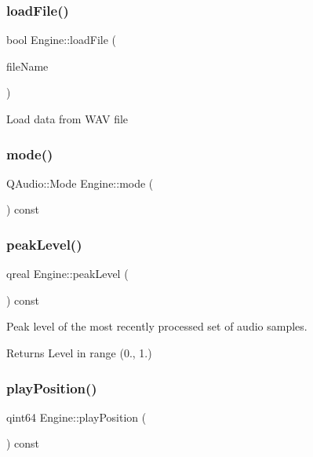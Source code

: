 \subsubsection{\texorpdfstring{load\+File()}{loadFile()}}
{\footnotesize\ttfamily bool Engine\+::load\+File (\begin{DoxyParamCaption}\item[{const Q\+String \&}]{file\+Name }\end{DoxyParamCaption})}

Load data from W\+AV file \hypertarget{class_engine_a63bb47972a1e0692432dd704a60e49bc}{}\label{class_engine_a63bb47972a1e0692432dd704a60e49bc} 
\subsubsection{\texorpdfstring{mode()}{mode()}}
{\footnotesize\ttfamily Q\+Audio\+::\+Mode Engine\+::mode (\begin{DoxyParamCaption}{ }\end{DoxyParamCaption}) const\hspace{0.3cm}{\ttfamily [inline]}}

\hypertarget{class_engine_aab1cbc9a117974fe64cb0875a02792ab}{}\label{class_engine_aab1cbc9a117974fe64cb0875a02792ab} 
\subsubsection{\texorpdfstring{peak\+Level()}{peakLevel()}}
{\footnotesize\ttfamily qreal Engine\+::peak\+Level (\begin{DoxyParamCaption}{ }\end{DoxyParamCaption}) const\hspace{0.3cm}{\ttfamily [inline]}}

Peak level of the most recently processed set of audio samples. \begin{DoxyReturn}{Returns}
Level in range (0., 1.) 
\end{DoxyReturn}
\hypertarget{class_engine_a2b295fe42d3e6e4f04f56c3f63ebe945}{}\label{class_engine_a2b295fe42d3e6e4f04f56c3f63ebe945} 
\subsubsection{\texorpdfstring{play\+Position()}{playPosition()}}
{\footnotesize\ttfamily qint64 Engine\+::play\+Position (\begin{DoxyParamCaption}{ }\end{DoxyParamCaption}) const\hspace{0.3cm}{\ttfamily [inline]}}

